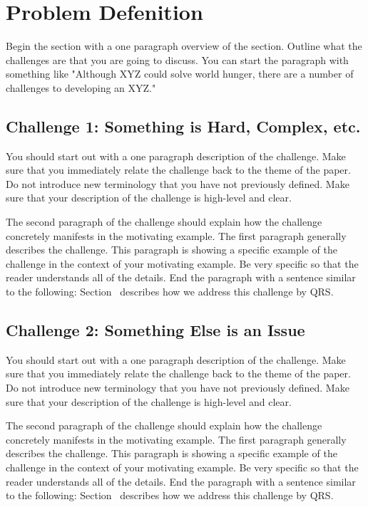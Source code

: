 \section{Problem Defenition}
\label{problem_defenition}

Begin the section with a one paragraph overview
of the section. Outline what the challenges are that
you are going to discuss. You can start the paragraph
with something like "Although XYZ could solve world
hunger, there are a number of challenges to developing
an XYZ."

\subsection{Challenge 1: Something is Hard, Complex, etc.}
\label{challenge1}

You should start out with a one paragraph description of
the challenge. Make sure that you immediately relate the
challenge back to the theme of the paper. Do not introduce
new terminology that you have not previously defined. Make
sure that your description of the challenge is high-level
and clear.

The second paragraph of the challenge should explain how
the challenge concretely manifests in the motivating example.
The first paragraph generally describes the challenge. This
paragraph is showing a specific example of the challenge in
the context of your motivating example. Be very specific
so that the reader understands all of the details. End
the paragraph with a sentence similar to the following:
Section~ describes how we address this
challenge by QRS.

\subsection{Challenge 2: Something Else is an Issue}
\label{challenge2}

You should start out with a one paragraph description of
the challenge. Make sure that you immediately relate the
challenge back to the theme of the paper. Do not introduce
new terminology that you have not previously defined. Make
sure that your description of the challenge is high-level
and clear.

The second paragraph of the challenge should explain how
the challenge concretely manifests in the motivating example.
The first paragraph generally describes the challenge. This
paragraph is showing a specific example of the challenge in
the context of your motivating example. Be very specific
so that the reader understands all of the details. End
the paragraph with a sentence similar to the following:
Section~ describes how we address this
challenge by QRS.

